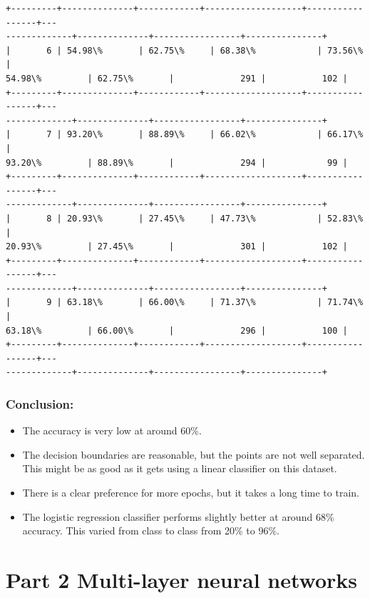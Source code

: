 \documentclass[a4paper,landscape]{article}
\providecommand{\tightlist}{%
      \setlength{\itemsep}{0pt}\setlength{\parskip}{0pt}}
\begin{document}
\begin{Verbatim}[commandchars=\\\{\}]
+---------+--------------+------------+-------------------+-----------------+---
-------------+--------------+-----------------+---------------+
|       6 | 54.98\%       | 62.75\%     | 68.38\%            | 73.56\%          |
54.98\%         | 62.75\%       |             291 |           102 |
+---------+--------------+------------+-------------------+-----------------+---
-------------+--------------+-----------------+---------------+
|       7 | 93.20\%       | 88.89\%     | 66.02\%            | 66.17\%          |
93.20\%         | 88.89\%       |             294 |            99 |
+---------+--------------+------------+-------------------+-----------------+---
-------------+--------------+-----------------+---------------+
|       8 | 20.93\%       | 27.45\%     | 47.73\%            | 52.83\%          |
20.93\%         | 27.45\%       |             301 |           102 |
+---------+--------------+------------+-------------------+-----------------+---
-------------+--------------+-----------------+---------------+
|       9 | 63.18\%       | 66.00\%     | 71.37\%            | 71.74\%          |
63.18\%         | 66.00\%       |             296 |           100 |
+---------+--------------+------------+-------------------+-----------------+---
-------------+--------------+-----------------+---------------+
    \end{Verbatim}

    \subsubsection{Conclusion:}\label{conclusion}

\begin{itemize}
\tightlist
\item
  The accuracy is very low at around 60\%.
\item
  The decision boundaries are reasonable, but the points are not well
  separated. This might be as good as it gets using a linear classifier
  on this dataset.
\item
  There is a clear preference for more epochs, but it takes a long time
  to train.
\item
  The logistic regression classifier performs slightly better at around
  68\% accuracy. This varied from class to class from 20\% to 96\%.
\end{itemize}

    \section{Part 2 Multi-layer neural
networks}\label{part-2-multi-layer-neural-networks}
\end{document}
